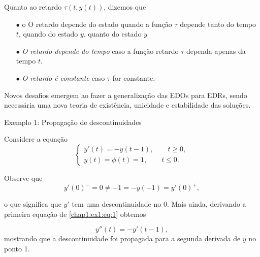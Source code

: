 \documentclass{beamer}
\theoremstyle{plain}
\theoremstyle{definition}
\begin{document}

\begin{frame}
    Quanto ao retardo $\tau(t, y(t))$, dizemos que
     \begin{itemize}
         \item[$\bullet$] {\color{red}o} O retardo depende do estado quando a função $\tau$ depende tanto do tempo $t$, quando do estado $y$.
         quanto do estado $y$
         \item[$\bullet$] \textit{O retardo depende do tempo} caso a função retardo $\tau$ dependa apenas da tempo $t$.
         \item[$\bullet$] \textit{O retardo é constante} caso $\tau$ for constante.
     \end{itemize}
     
    Novos desafios emergem ao fazer a generalização das EDOs para EDRs, sendo necessária uma nova teoria de existência, unicidade e estabilidade das soluções.

\end{frame}



\begin{frame}{Exemplo 1: Propagação de descontinuidades}

        Considere a equação
        \begin{equation}
            \begin{cases}
                y'(t) = -y(t - 1), \qquad t \geq 0, \\
                y(t) = \phi(t) = 1, \qquad t \leq 0.
            \end{cases} 
            \label{chap1:ex1:eq:1}
        \end{equation}


        \noindent
        Observe que
        \[
            y'(0)^- = 0 \neq -1 = -y(-1) = y'(0)^+,
        \]

        \noindent
        o que significa que $y'$ tem uma descontinuidade no 0. Mais ainda, derivando a primeira equação de \eqref{chap1:ex1:eq:1} obtemos

        \noindent
        \begin{equation*}
            y''(t) = - y'(t - 1) ,
            \label{ex_intro1_eq1}
        \end{equation*}
        mostrando que a descontinuidade foi propagada para a segunda derivada de $y$ no ponto 1.  
\end{frame}
\end{document}

